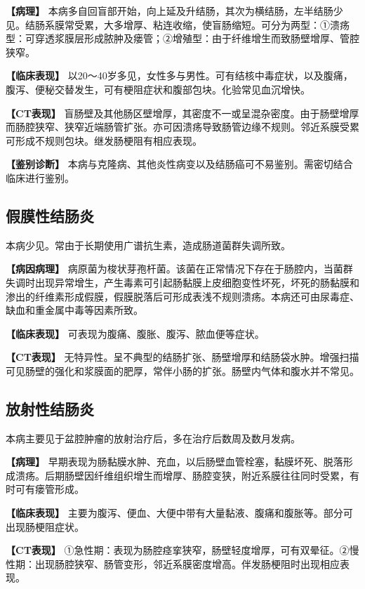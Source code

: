 \textbf{【病理】}
本病多自回盲部开始，向上延及升结肠，其次为横结肠，左半结肠少见。结肠系膜常受累，大多增厚、粘连收缩，使盲肠缩短。可分为两型：①溃疡型：可穿透浆膜层形成脓肿及瘘管；②增殖型：由于纤维增生而致肠壁增厚、管腔狭窄。

\textbf{【临床表现】}
以20～40岁多见，女性多与男性。可有结核中毒症状，以及腹痛，腹泻、便秘交替发生，可有梗阻症状和腹部包块。化验常见血沉增快。

\textbf{【CT表现】}
盲肠壁及其他肠区壁增厚，其密度不一或呈混杂密度。由于肠壁增厚而肠腔狭窄、狭窄近端肠管扩张。亦可因溃疡导致肠管边缘不规则。邻近系膜受累可形成不规则包块。继发肠梗阻有相应表现。

\textbf{【鉴别诊断】}
本病与克隆病、其他炎性病变以及结肠癌可不易鉴别。需密切结合临床进行鉴别。

\subsection{假膜性结肠炎}

本病少见。常由于长期使用广谱抗生素，造成肠道菌群失调所致。

\textbf{【病因病理】}
病原菌为梭状芽孢杆菌。该菌在正常情况下存在于肠腔内，当菌群失调时出现异常增生，产生毒素可引起肠黏膜上皮细胞变性坏死，坏死的肠黏膜和渗出的纤维素形成假膜，假膜脱落后可形成表浅不规则溃疡。本病还可由尿毒症、缺血和重金属中毒等因素所致。

\textbf{【临床表现】} 可表现为腹痛、腹胀、腹泻、脓血便等症状。

\textbf{【CT表现】}
无特异性。呈不典型的结肠扩张、肠壁增厚和结肠袋水肿。增强扫描可见肠壁的强化和浆膜面的肥厚，常伴小肠的扩张。肠壁内气体和腹水并不常见。

\subsection{放射性结肠炎}

本病主要见于盆腔肿瘤的放射治疗后，多在治疗后数周及数月发病。

\textbf{【病理】}
早期表现为肠黏膜水肿、充血，以后肠壁血管栓塞，黏膜坏死、脱落形成溃疡。后期肠壁因纤维组织增生而增厚、肠腔变狭，附近系膜往往同时受累，有时可有瘘管形成。

\textbf{【临床表现】}
主要为腹泻、便血、大便中带有大量黏液、腹痛和腹胀等。部分可出现肠梗阻症状。

\textbf{【CT表现】}
①急性期：表现为肠腔痉挛狭窄，肠壁轻度增厚，可有双晕征。②慢性期：出现肠腔狭窄、肠管变形，邻近系膜密度增高。伴发肠梗阻时出现相应表现。

